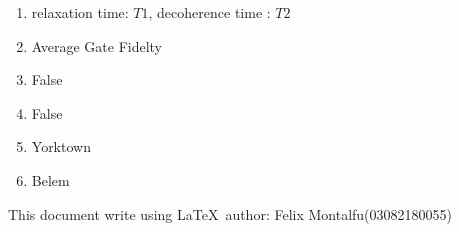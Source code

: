 \documentclass[a4paper]{article}
\begin{document}
    \begin{enumerate}
        \item relaxation time: $T1$, decoherence time : $T2$
        \item Average Gate Fidelty
        \item False
        \item False
        \item Yorktown
        \item Belem
    \end{enumerate}
    This document write using \LaTeX \ author: Felix Montalfu(03082180055)
\end{document}
